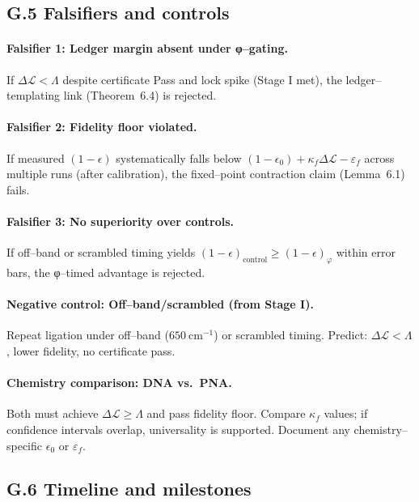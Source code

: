 \documentclass[11pt]{article}
\begin{document}
\subsection*{G.5 Falsifiers and controls}

\paragraph{Falsifier 1: Ledger margin absent under φ–gating.}
If $\Delta\mathcal{L}<\Lambda$ despite certificate \textsf{Pass} and lock spike (Stage I met), the ledger–templating link (Theorem~6.4) is rejected.

\paragraph{Falsifier 2: Fidelity floor violated.}
If measured $(1-\epsilon)$ systematically falls below $(1-\epsilon_0)+\kappa_f\Delta\mathcal{L}-\varepsilon_f$ across multiple runs (after calibration), the fixed–point contraction claim (Lemma~6.1) fails.

\paragraph{Falsifier 3: No superiority over controls.}
If off–band or scrambled timing yields $(1-\epsilon)_{\mathrm{control}}\ge (1-\epsilon)_\varphi$ within error bars, the φ–timed advantage is rejected.

\paragraph{Negative control: Off–band/scrambled (from Stage I).}
Repeat ligation under off–band ($650~\mathrm{cm^{-1}}$) or scrambled timing. Predict: $\Delta\mathcal{L}<\Lambda$, lower fidelity, no certificate pass.

\paragraph{Chemistry comparison: DNA vs.\ PNA.}
Both must achieve $\Delta\mathcal{L}\ge\Lambda$ and pass fidelity floor. Compare $\kappa_f$ values; if confidence intervals overlap, universality is supported. Document any chemistry–specific $\epsilon_0$ or $\varepsilon_f$.

\subsection*{G.6 Timeline and milestones}
\end{document}
